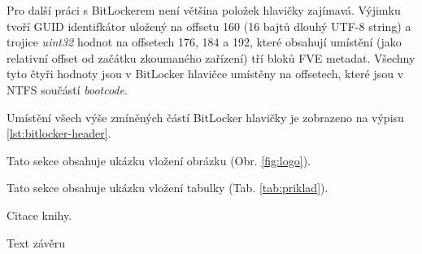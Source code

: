 Pro další práci s BitLockerem není většina položek hlavičky zajímavá. Výjimku tvoří GUID identifkátor uložený na offsetu 160 (16 bajtů dlouhý UTF-8 string) a trojice \emph{uint32} hodnot na offsetech 176, 184 a 192, které obsahují umístění (jako relativní offset od začátku zkoumaného zařízení) tří bloků FVE metadat. Všechny tyto čtyři hodnoty jsou v BitLocker hlavičce umístěny na offsetech, které jsou v NTFS součástí \emph{bootcode}.

Umístění všech výše zmíněných  částí BitLocker hlavičky je zobrazeno na výpisu \ref{lst:bitlocker-header}.













Tato sekce obsahuje ukázku vložení obrázku (Obr. \ref{fig:logo}).



Tato sekce obsahuje ukázku vložení tabulky (Tab. \ref{tab:priklad}).



Citace knihy.






Text závěru


